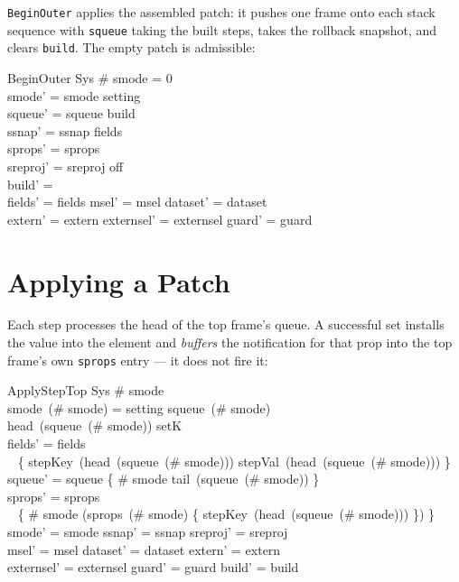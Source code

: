 \documentclass[a4paper,10pt,fleqn]{article}
\begin{document}
\texttt{BeginOuter} applies the assembled patch: it pushes one frame onto each
stack sequence with \texttt{squeue} taking the built steps, takes the rollback
snapshot, and clears \texttt{build}.  The empty patch is admissible:

\begin{schema}{BeginOuter}
  \Delta Sys
\where
  \# smode = 0 \\
  smode' = smode \cat \langle setting \rangle \\
  squeue' = squeue \cat \langle build \rangle \\
  ssnap' = ssnap \cat \langle fields \rangle \\
  sprops' = sprops \cat \langle \emptyset \rangle \\
  sreproj' = sreproj \cat \langle off \rangle \\
  build' = \langle \rangle \\
  fields' = fields \land msel' = msel \land dataset' = dataset \\
  \land extern' = extern \land externsel' = externsel \land guard' = guard
\end{schema}

\section{Applying a Patch}
\label{sec:apply}

Each step processes the head of the top frame's queue.  A successful set installs
the value into the element and \emph{buffers} the notification for that prop into
the top frame's own \texttt{sprops} entry --- it does not fire it:

\begin{schema}{ApplyStepTop}
  \Delta Sys
\where
  \# smode  \\
  smode~(\# smode) = setting \land squeue~(\# smode) \neq \langle \rangle \\
  head~(squeue~(\# smode)) \in \ran setK \\
  fields' = fields \oplus \\
  \quad~ \{ stepKey~(head~(squeue~(\# smode))) \mapsto
           stepVal~(head~(squeue~(\# smode))) \} \\
  squeue' = squeue \oplus \{ \# smode \mapsto tail~(squeue~(\# smode)) \} \\
  sprops' = sprops \oplus \\
  \quad~ \{ \# smode \mapsto (sprops~(\# smode) \cup
           \{ stepKey~(head~(squeue~(\# smode))) \}) \} \\
  smode' = smode \land ssnap' = ssnap \land sreproj' = sreproj \\
  msel' = msel \land dataset' = dataset \land extern' = extern \\
  \land externsel' = externsel \land guard' = guard \land build' = build
\end{schema}
\end{document}
